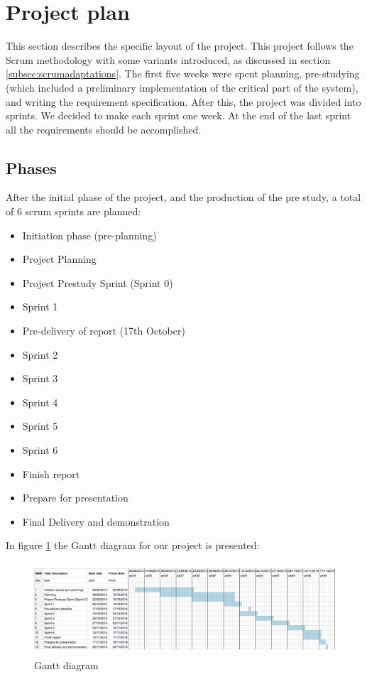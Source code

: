 \documentclass[11pt,a4paper,titlepage,oneside]{report}
\begin{document}
\section{Project plan}
This section describes the specific layout of the project. This project follows the Scrum methodology with some variants introduced, as discussed in section \ref{subsec:scrumadaptations}. The first five weeks were spent planning, pre-studying (which included a preliminary implementation of the critical part of the system), and writing the requirement specification. After this, the project was divided into sprints. We decided to make each sprint one week. At the end of the last sprint all the requirements should be accomplished.

\subsection{Phases}
After the initial phase of the project, and the production of the pre study, a total of 6 scrum sprints are planned:
\begin{itemize}
\item Initiation phase (pre-planning)
\item Project Planning
\item Project Prestudy Sprint (Sprint 0)

\item Sprint 1
\item Pre-delivery of report (17th October)

\item Sprint 2
\item Sprint 3
\item Sprint 4
\item Sprint 5
\item Sprint 6

\item Finish report
\item Prepare for presentation
\item Final Delivery and demonstration
\end{itemize}

In figure \ref{fig:gantt} the Gantt diagram for our project is presented:
\begin{figure}[h]
\begin{center}
\includegraphics[height=130px,width=440px]{img/gantt.png}
\caption{Gantt diagram}
\label{fig:gantt}
\medskip
\small
\end{center}
\end{figure}
\end{document}
